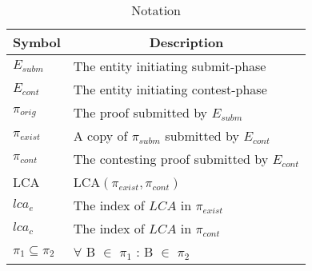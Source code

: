 \begin{table}[H]
\begin{tabular}{ll}
\hline
\multicolumn{1}{|c|}{Symbol} & \multicolumn{1}{c|}{Description} \\ \hline
$E_{subm}$      & The entity initiating submit-phase \\
$E_{cont}$      & The entity initiating contest-phase \\
$\pi_{orig}$    & The proof submitted by $E_{subm}$ \\
$\pi_{exist}$   & A copy of $\pi_{subm}$ submitted by $E_{cont}$ \\
$\pi_{cont}$    & The contesting proof submitted by $E_{cont}$ \\
LCA           & LCA$(\pi_{exist}, \pi_{cont})$ \\
$lca_{e}$       & The index of $LCA$ in $\pi_{exist}$ \\
$lca_{c}$       & The index of $LCA$ in $\pi_{cont}$ \\
$\pi_1 \subseteq \pi_2$ & {$\forall$ B $\in$ $\pi_1$ : B $\in$ $\pi_2$} \\

\end{tabular}
\centering
\caption{Notation}
\label{table:notation_verifier}
\end{table}
